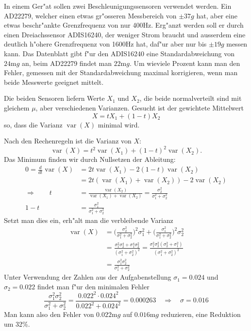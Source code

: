 In einem Ger"at sollen zwei Beschleunigungssensoren verwendet
werden. Ein AD22279, welcher einen etwas gr"osseren Messbereich von
$\pm37g$ hat, aber eine etwas beschr"ankte Grenzfrequenz von nur 400Hz.
Erg"anzt werden soll er durch einen Dreiachssensor ADIS16240,
der weniger Strom braucht und ausserdem eine deutlich h"ohere
Grenzfrequenz von 1600Hz hat, daf"ur aber nur bis $\pm19g$ messen kann.
Das Datenblatt gibt f"ur den ADIS16240 eine Standardabweichung von
$24\text{m}g$ an, beim AD22279 findet man $22\text{m}g$.
Um wieviele Prozent kann man den Fehler, gemessen mit
der Standardabweichung maximal korrigieren, wenn man beide
Messwerte geeignet mittelt.

\begin{loesung}
Die beiden Sensoren liefern Werte $X_1$ und $X_2$, die
beide normalverteilt sind mit gleichem $\mu$, aber verschiedenen
Varianzen. Gesucht ist der gewichtete Mittelwert
\[
X=tX_1+(1-t)X_2
\]
so, dass die Varianz $\operatorname{var}(X)$ minimal wird.

Nach den Rechenregeln ist die Varianz von $X$:
\[
\operatorname{var}(X)=t^2\operatorname{var}(X_1)+(1-t)^2\operatorname{var}(X_2).
\]
Das Minimum finden wir durch Nullsetzen der Ableitung:
\begin{align*}
0=\frac{d}{dt}\operatorname{var}(X)
&=
2t\operatorname{var}(X_1)-2(1-t)\operatorname{var}(X_2)
\\
&=
2t(\operatorname{var}(X_1)+\operatorname{var}(X_2)) -2\operatorname{var}(X_2)
\\
\Rightarrow\qquad
t&=\frac{\operatorname{var}(X_2)}{\operatorname{var}(X_1)+\operatorname{var}(X_2)}
=\frac{\sigma_2^2}{\sigma_1^2+\sigma_2^2}
\\
1-t&=
\frac{\sigma_1^2}{\sigma_1^2+\sigma_2^2}
\end{align*}
Setzt man dies ein, erh"alt man die verbleibende Varianz
\begin{align*}
\operatorname{var}(X)
&=
\biggl(
\frac{\sigma_2^2}{\sigma_1^2+\sigma_2^2}
\biggr)^2
\sigma_1^2
+
\biggl(
\frac{\sigma_1^2}{\sigma_1^2+\sigma_2^2}
\biggr)^2
\sigma_2^2
\\
&=\frac{\sigma_1^2\sigma_2^4+\sigma_1^4\sigma_2^2}{(\sigma_1^2+\sigma_2^2)^2}
=\frac{\sigma_1^2\sigma_2^2(\sigma_2^2+\sigma_1^2)}{(\sigma_1^2+\sigma_2^2)^2}
\\
&=
\frac{\sigma_1^2\sigma_2^2}{\sigma_1^2+\sigma_2^2}
\end{align*}
Unter Verwendung der Zahlen aus der Aufgabenstellung
$\sigma_1=0.024$ und $\sigma_2=0.022$ findet man f"ur
den minimalen Fehler
\[
\frac{\sigma_1^2\sigma_2^2}{\sigma_1^2+\sigma_2^2}=\frac{0.022^2\cdot 0.024^2}{0.022^2+0.024^2}=0.000263
\quad\Rightarrow\quad
\sigma
=0.016
\]
Man kann also den Fehler von $0.022\text{m}g$ auf
$0.016\text{m}g$ reduzieren, eine Reduktion um 32\%.
\end{loesung}

